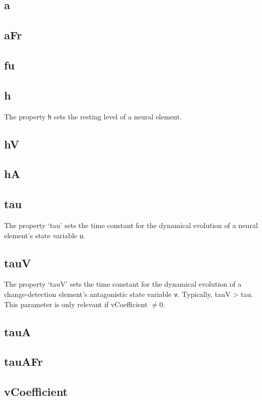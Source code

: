 \documentclass[phd, 12pt, doublespace, online]{fauthesis}
\begin{document}
\subsection{a}
\subsection{aFr}
\subsection{fu}
\subsection{h}

The property {\tt h} sets the resting level of a neural element. 

\subsection{hV}
\subsection{hA}

\subsection{tau}

The property `tau' sets the time constant for the dynamical evolution of a neural element's state variable {\tt u}. 

\subsection{tauV}

The property `tauV' sets the time constant for the dynamical evolution of a change-detection element's antagonistic state variable {\tt v}. Typically, tauV > tau. This parameter is only relevant if vCoefficient $\neq 0$. 

\subsection{tauA}
\subsection{tauAFr}

\subsection{vCoefficient}
\end{document}
